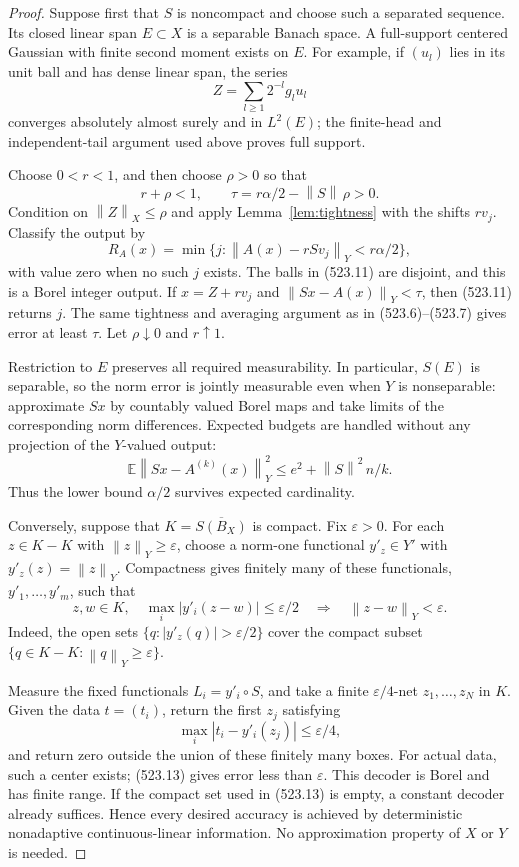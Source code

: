 \documentclass[11pt,a4paper]{article}
\newcommand{\E}{\mathbb E}
\newcommand{\norm}[1]{\left\lVert#1\right\rVert}
\newcommand{\abs}[1]{\left\lvert#1\right\rvert}
\theoremstyle{definition}
\theoremstyle{remark}
\numberwithin{equation}{section}
\begin{document}
\begin{proof}
Suppose first that \(S\) is noncompact and choose such a separated
sequence. Its closed linear span \(E\subset X\) is a separable Banach
space. A full-support centered Gaussian with finite second moment
exists on \(E\). For example, if \((u_l)\) lies in its unit ball and
has dense linear span, the series
\[
                         Z=\sum_{l\ge1}2^{-l}g_lu_l
 \tag{523.10}
\]
converges absolutely almost surely and in \(L^2(E)\); the finite-head
and independent-tail argument used above proves full support.

Choose \(0<r<1\), and then choose \(\rho>0\) so that
\[
         r+\rho<1,\qquad \tau=r\alpha/2-\norm S\,\rho>0.
\]
Condition on \(\norm Z_X\le\rho\) and apply
Lemma~\ref{lem:tightness} with the shifts \(rv_j\). Classify the output
by
\[
 R_A(x)=\min\{j:\norm{A(x)-rSv_j}_Y<r\alpha/2\},
 \tag{523.11}
\]
with value zero when no such \(j\) exists. The balls in (523.11) are
disjoint, and this is a Borel integer output. If
\(x=Z+rv_j\) and \(\norm{Sx-A(x)}_Y<\tau\), then (523.11) returns
\(j\). The same tightness and averaging argument as in (523.6)--(523.7)
gives error at least \(\tau\). Let \(\rho\downarrow0\) and
\(r\uparrow1\).

Restriction to \(E\) preserves all required measurability. In
particular, \(S(E)\) is separable, so the norm error is jointly
measurable even when \(Y\) is nonseparable: approximate \(Sx\) by
countably valued Borel maps and take limits of the corresponding norm
differences. Expected budgets are handled without any projection of
the \(Y\)-valued output:
\[
 \E\norm{Sx-A^{(k)}(x)}_Y^2
       \le e^2+\norm S^2\,n/k .
 \tag{523.12}
\]
Thus the lower bound \(\alpha/2\) survives expected cardinality.

Conversely, suppose that \(K=\overline{S(B_X)}\) is compact. Fix
\(\varepsilon>0\). For each \(z\in K-K\) with \(\norm z_Y\ge\varepsilon\),
choose a norm-one functional \(y'_z\in Y'\) with
\(y'_z(z)=\norm z_Y\). Compactness gives finitely many of these
functionals, \(y'_1,\ldots,y'_m\), such that
\[
 z,w\in K,\quad
 \max_i\abs{y'_i(z-w)}\le\varepsilon/2
                 \quad\Longrightarrow\quad
 \norm{z-w}_Y<\varepsilon .
 \tag{523.13}
\]
Indeed, the open sets
\(\{q:\abs{y'_z(q)}>\varepsilon/2\}\) cover the compact subset
\(\{q\in K-K:\norm q_Y\ge\varepsilon\}\).

Measure the fixed functionals \(L_i=y'_i\circ S\), and take a finite
\(\varepsilon/4\)-net \(z_1,\ldots,z_N\) in \(K\). Given the data
\(t=(t_i)\), return the first \(z_j\) satisfying
\[
                  \max_i\abs{t_i-y'_i(z_j)}\le\varepsilon/4,
 \tag{523.14}
\]
and return zero outside the union of these finitely many boxes.
For actual data, such a center exists; (523.13) gives error less than
\(\varepsilon\). This decoder is Borel and has finite range.
If the compact set used in (523.13) is empty, a constant decoder
already suffices. Hence every desired accuracy is achieved by
deterministic nonadaptive continuous-linear information. No
approximation property of \(X\) or \(Y\) is needed.
\end{proof}
\end{document}
